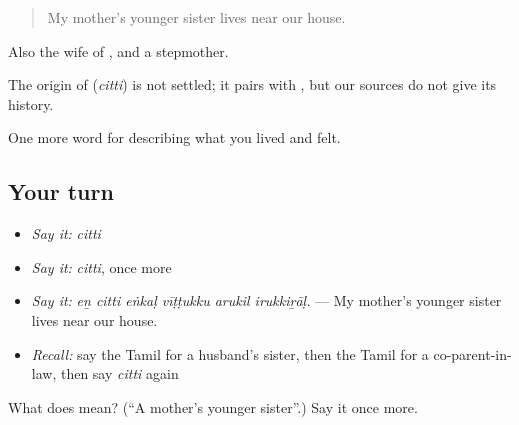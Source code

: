 \begin{quote}
My mother’s younger sister lives near our house.
\end{quote}

Also the wife of , and a stepmother.

\begin{cousinweb}
The origin of \textbf{} (\emph{citti}) is not settled; it pairs with , but our sources do not give its history.
\end{cousinweb}

\begin{grammarlens}[title={What you've built}]
One more word for describing what you lived and felt.
\end{grammarlens}

\subsection*{Your turn}
\begin{itemize}
\raggedright
  \item \emph{Say it:} \emph{citti}
  \item \emph{Say it:} \emph{citti}, once more
  \item \emph{Say it:} \emph{eṉ citti eṅkaḷ vīṭṭukku arukil irukkiṟāḷ.} — My mother’s younger sister lives near our house.
  \item \emph{Recall:} say the Tamil for a husband’s sister, then the Tamil for a co-parent-in-law, then say \emph{citti} again
\end{itemize}

\begin{tcolorbox}[breakable,colback=teal!4,colframe=teal!35!black,title={Before you move on}]
What does  mean? (\textquotedblleft{}A mother’s younger sister\textquotedblright{}.) Say it once more.
\end{tcolorbox}
